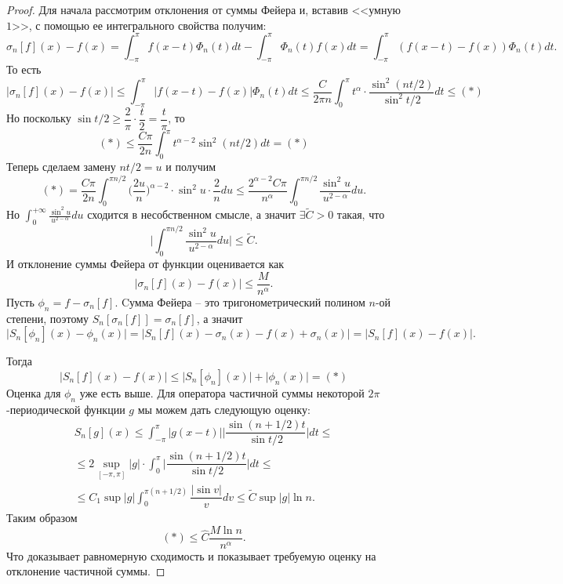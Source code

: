 \begin{proof}
    Для начала рассмотрим отклонения от суммы Фейера и, вставив <<умную $1$>>, с помощью ее интегрального свойства получим:
    \[
        \sigma_n[f](x) - f(x) = \int_{-\pi}^\pi f(x - t)\Phi_n(t)dt - \int_{-\pi}^{\pi}\Phi_n(t)f(x)dt = \int_{-\pi}^{\pi} (f(x - t) - f(x))\Phi_n(t)dt.
    \]
    То есть \[
                |\sigma_n[f](x) - f(x)| \leq \int_{-\pi}^{\pi}|f(x - t) - f(x)|\Phi_n(t)dt \leq \dfrac{C}{2\pi n} \int_{0}^{\pi} t^\alpha \cdot \dfrac{\sin^2 (nt/2)}{\sin^2 t/2}dt \leq (*)
    \]
    Но поскольку $\sin t/2 \geq \dfrac{2}{\pi} \cdot \dfrac{t}{2} = \dfrac{t}{\pi}$, то \[
                                                                                            (*) \leq \dfrac{C\pi}{2n} \int_0^{\pi} t^{\alpha - 2}\sin^2(nt/2)dt = (*)
    \]
    Теперь сделаем замену $nt/2 = u$ и получим \[
                                                   (*) = \dfrac{C \pi}{2 n} \int_0^{\pi n/2} \biggr(\dfrac{2u}{n}\biggr)^{\alpha - 2}\cdot\sin^2 u\cdot \dfrac{2}{n}du \leq \dfrac{2^{\alpha - 2}C \pi}{n^\alpha}\int_0^{\pi n / 2} \dfrac{\sin^2 u}{u^{2 - \alpha}}du.
    \]
    Но $\displaystyle \int_0^{+\infty}\frac{\sin^2 u}{u^{2 - \alpha}}du$ сходится в несобственном смысле, а значит $\exists \widetilde{C} > 0$ такая, что \[
                                                                                                                                                              \biggr|\int_0^{\pi n / 2}\dfrac{\sin^2 u}{u^{2 - \alpha}}du\biggr| \leq \widetilde{C}.
    \]
    И отклонение суммы Фейера от функции оценивается как \[
                                                             |\sigma_n[f](x) - f(x)| \leq \dfrac{M}{n^\alpha}.
    \]
    Пусть $\phi_n = f -\sigma_n[f]$. Cумма Фейера -- это тригонометрический полином $n$-ой степени, поэтому $S_n[\sigma_n[f]] = \sigma_n[f]$, а значит
    \[
        \big|S_n[\phi_n](x) - \phi_n(x)\big| = \big|S_n[f](x) - \sigma_n(x) - f(x) + \sigma_n(x) \big| = \big|S_n[f](x) - f(x)\big|.
    \]

    Тогда
    \[                                                                           \big|S_n[f](x) - f(x)\big| \leq \big|S_n[\phi_n](x)\big| + \big|\phi_n(x)\big| = (*)
    \]
    Оценка для $\phi_n$ уже есть выше.
    Для оператора частичной суммы некоторой $2\pi$-периодической функции $g$ мы можем дать следующую оценку:
    \begin{multline*}
        S_n[g](x) \leq \int_{-\pi}^{\pi}|g(x - t)|\biggr|\dfrac{\sin (n + 1/2)t}{\sin t/2}\biggr|dt \leq \\ \leq 2\sup\limits_{[-\pi, \pi]}|g| \cdot \int_{0}^\pi \biggr|\dfrac{\sin (n + 1/2)t}{\sin t/2}\biggr| dt \leq \\ \leq C_1 \sup |g| \int_0^{\pi (n + 1/2)} \dfrac{|\sin v|}{v}dv \leq \widetilde{C}\sup|g| \ln n.
    \end{multline*}
    Таким образом \[
                      (*) \leq \widehat{C}\dfrac{M\ln n}{n^\alpha}.
    \]
    Что доказывает равномерную сходимость и показывает требуемую оценку на отклонение частичной суммы.
\end{proof}
